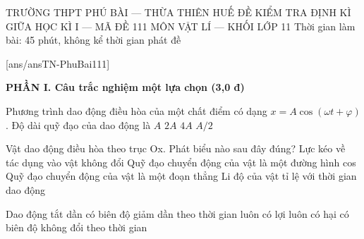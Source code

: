 \def\toanlop{11}
\def\thoigian{45}
\def\namhoc{2025 - 2026}
\begin{dethi}
	{TRƯỜNG THPT PHÚ BÀI --- THỪA THIÊN HUẾ}
	{ĐỀ KIỂM TRA ĐỊNH KÌ GIỮA HỌC KÌ I --- MÃ ĐỀ 111}
	{MÔN VẬT LÍ --- KHỐI LỚP 11}
	{Thời gian làm bài: 45 phút, không kể thời gian phát đề}
\end{dethi}

[ans/ansTN-PhuBai111]

\noindent \textbf{PHẦN I. Câu trắc nghiệm một lựa chọn (3,0 đ)}
\vspace{0.2cm}

\begin{ex}%
	Phương trình dao động điều hòa của một chất điểm có dạng $x=A \cos (\omega t+\varphi)$. Độ dài quỹ đạo của dao động là
	\choice
	{$A$}
	{\True $2A$}
	{$4A$}
	{$A/2$}
\end{ex}

\begin{ex}%
	Vật dao động điều hòa theo trục Ox. Phát biểu nào sau đây đúng?
	\choice
	{Lực kéo về tác dụng vào vật không đổi}
	{Quỹ đạo chuyển động của vật là một đường hình cos}
	{\True Quỹ đạo chuyển động của vật là một đoạn thẳng}
	{Li độ của vật tỉ lệ với thời gian dao động}
\end{ex}

\begin{ex}%
	Dao động tắt dần
	\choice
	{\True có biên độ giảm dần theo thời gian}
	{luôn có lợi}
	{luôn có hại}
	{có biên độ không đổi theo thời gian}
\end{ex}

